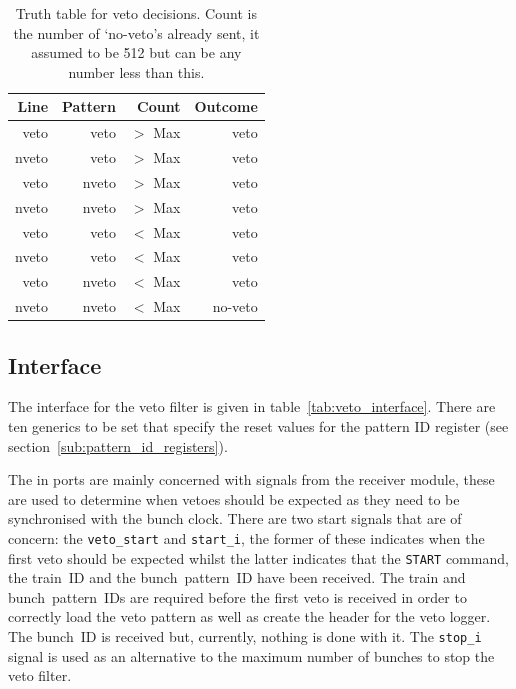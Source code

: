 \begin{table}[htbp]
  \begin{center}
    \begin{tabular}{r|r|r||r}
      Line  & Pattern &   Count   & Outcome \\
      \hline
      veto  &   veto  & \(>\) Max & veto    \\
      nveto &   veto  & \(>\) Max & veto    \\
      veto  &  nveto  & \(>\) Max & veto    \\
      nveto &  nveto  & \(>\) Max & veto    \\
      \hline
      veto  &   veto  & \(<\) Max & veto    \\
      nveto &   veto  & \(<\) Max & veto    \\
      veto  &  nveto  & \(<\) Max & veto    \\
      nveto &  nveto  & \(<\) Max & no-veto \\
            
    \end{tabular}
  \end{center}
  \caption{Truth table for veto decisions. Count is the number of `no-veto's already sent, it assumed to be 512 but can be any number less than this.}
  \label{tab:veto_truth_table}
\end{table}

\subsection{Interface} %
\label{sub:veto_interface}
The interface for the veto filter is given in table~\ref{tab:veto_interface}. There are ten generics to be set that specify the reset values for the pattern ID register (see section~\ref{sub:pattern_id_registers}).
    
The in ports are mainly concerned with signals from the receiver module, these are used to determine when vetoes should be expected as they need to be synchronised with the bunch clock. There are two start signals that are of concern: the \texttt{veto\_start} and \texttt{start\_i}, the former of these indicates when the first veto should be expected whilst the latter indicates that the \texttt{START} command, the train~ID and the bunch~pattern~ID have been received. The train and bunch~pattern~IDs are required before the first veto is received in order to correctly load the veto pattern as well as create the header for the veto logger. The bunch~ID is received but, currently, nothing is done with it. The \texttt{stop\_i} signal is used as an alternative to the maximum number of bunches to stop the veto filter.
    
